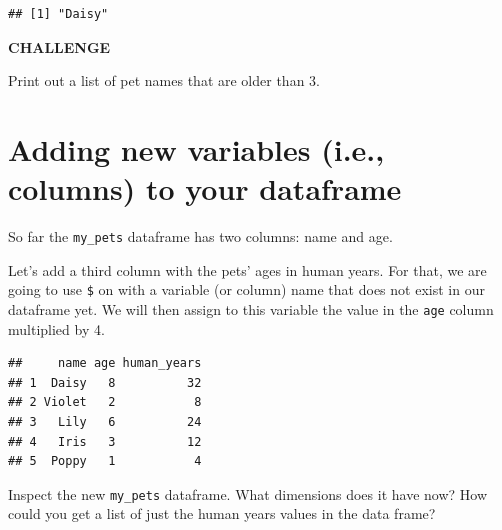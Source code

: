 \documentclass[
]{book}
\newenvironment{Shaded}{\begin{snugshade}}{\end{snugshade}}
\newcommand{\CommentTok}[1]{\textcolor[rgb]{0.56,0.35,0.01}{\textit{#1}}}
\newcommand{\DecValTok}[1]{\textcolor[rgb]{0.00,0.00,0.81}{#1}}
\newcommand{\KeywordTok}[1]{\textcolor[rgb]{0.13,0.29,0.53}{\textbf{#1}}}
\newcommand{\NormalTok}[1]{#1}
\newcommand{\OperatorTok}[1]{\textcolor[rgb]{0.81,0.36,0.00}{\textbf{#1}}}
\newcommand{\StringTok}[1]{\textcolor[rgb]{0.31,0.60,0.02}{#1}}
\begin{document}
\begin{Shaded}
\end{Shaded}

\begin{verbatim}
## [1] "Daisy"
\end{verbatim}

\textbf{CHALLENGE}

Print out a list of pet names that are older than 3.

\hypertarget{adding-new-variables-i.e.-columns-to-your-dataframe}{%
\section{Adding new variables (i.e., columns) to your dataframe}\label{adding-new-variables-i.e.-columns-to-your-dataframe}}

So far the \texttt{my\_pets} dataframe has two columns: name and age.

Let's add a third column with the pets' ages in human years. For that, we are going to use \texttt{\$} on with a variable (or column) name that does not exist in our dataframe yet. We will then assign to this variable the value in the \texttt{age} column multiplied by 4.

\begin{Shaded}
\end{Shaded}

\begin{verbatim}
##     name age human_years
## 1  Daisy   8          32
## 2 Violet   2           8
## 3   Lily   6          24
## 4   Iris   3          12
## 5  Poppy   1           4
\end{verbatim}

Inspect the new \texttt{my\_pets} dataframe. What dimensions does it have now? How could you get a list of just the human years values in the data frame?
\end{document}
